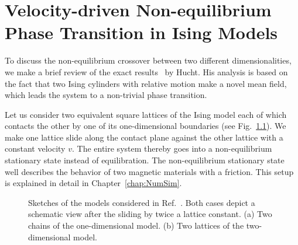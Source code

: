 
\chapter{Velocity-driven Non-equilibrium Phase Transition in Ising Models}\label{ch:review}

To discuss the non-equilibrium crossover between two different dimensionalities, we make a brief review of the exact results~\cite{Hucht2009b} by Hucht. His analysis is based on the fact that two Ising cylinders with relative motion make a novel mean field, which leads the system to a non-trivial phase transition.

Let us consider two equivalent square lattices of the Ising model each of which contacts the other by one of its one-dimensional boundaries (see Fig.~\ref{fig:SketchNEIsing}). We make one lattice slide along the contact plane against the other lattice with a constant velocity $v$. The entire system thereby goes into a non-equilibrium stationary state instead of equilibration. The non-equilibrium stationary state well describes the behavior of two magnetic materials with a friction. This setup is explained in detail in Chapter~\ref{chap:NumSim}.

\begin{figure}[htbp]
	\centering
	\caption{Sketches of the models considered in Ref.~\cite{Hucht2009b}. Both cases depict a schematic view after the sliding by twice a lattice constant. (a) Two chains of the one-dimensional model. (b) Two lattices of the two-dimensional model.}
	\label{fig:SketchNEIsing}
\end{figure}

